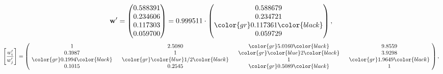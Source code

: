 \begin{example}
\begin{equation*}
\mathbf{w}^{\prime} =
\begin{pmatrix}
0.588391\\
0.234606\\
0.117303\\
0.059700
\end{pmatrix} =
0.999511\cdot
\begin{pmatrix}
0.588679\\
0.234721\\
\color{gr} 0.117361\color{black} \\
0.059729
\end{pmatrix},
\end{equation*}
\begin{equation*}
\left[ \frac{{w}^{\prime}_i}{{w}^{\prime}_j} \right] =
\begin{pmatrix}
$\,\,$ 1 $\,\,$ & $\,\,$2.5080$\,\,$ & $\,\,$\color{gr} 5.0160\color{black} $\,\,$ & $\,\,$9.8559$\,\,$ \\
$\,\,$0.3987$\,\,$ & $\,\,$ 1 $\,\,$ & $\,\,$\color{gr} \color{blue} 2\color{black} $\,\,$ & $\,\,$3.9298  $\,\,$ \\
$\,\,$\color{gr} 0.1994\color{black} $\,\,$ & $\,\,$\color{gr} \color{blue}  1/2\color{black} $\,\,$ & $\,\,$ 1 $\,\,$ & $\,\,$\color{gr} 1.9649\color{black}  $\,\,$ \\
$\,\,$0.1015$\,\,$ & $\,\,$0.2545$\,\,$ & $\,\,$\color{gr} 0.5089\color{black} $\,\,$ & $\,\,$ 1  $\,\,$ \\
\end{pmatrix},
\end{equation*}
\end{example}
\newpage
